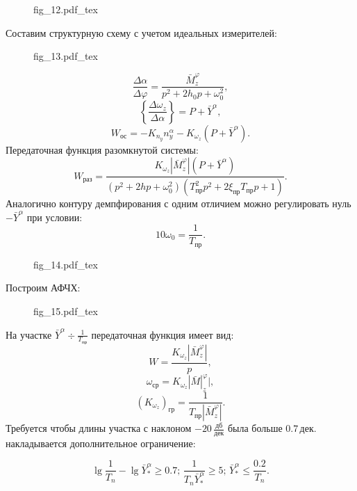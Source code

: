 \documentclass{article}
\begin{document}
\begin{figure}[H]
	\centering
	{fig_12.pdf_tex}
\end{figure}
Составим структурную схему с учетом идеальных измерителей:
\begin{figure}[H]
	\centering
	{fig_13.pdf_tex}
\end{figure}
\[
	\frac{\Delta \alpha}{\Delta \varphi} = \frac{\bar{M}_z^\varphi}{p^2 + 2 h_0
		p + \omega_0^2},
\]
\[
	\left\{ \frac{\Delta \omega_z}{\Delta \alpha}\right\} = P + \bar{Y}^\alpha,
\]
\[
	W_\text{ос} = -K_{n_y} n_y^\alpha - K_{\omega_z} (P + \bar{Y}^\alpha).
\]
Передаточная функция разомкнутой системы:
\[
	W_\text{раз} = \frac{K_{\omega_z} |\bar{M}_z^{\varphi}|(P +
	\bar{Y}^\alpha)}{(p^2 + 2h p + \omega_0^2)(T_\text{пр}^2 p^2 + 2
	\xi_\text{пр} T_\text{пр} p + 1)}.
\]
Аналогично контуру демпфирования с одним отличием можно регулировать нуль
$-\bar{Y}^\alpha$ при условии:
\[
    10 \omega_0 = \frac{1}{T_\text{пр}}.
\]
\begin{figure}[H]
	\centering
	{fig_14.pdf_tex}
\end{figure}
Построим АФЧХ:
\begin{figure}[H]
	\centering
	{fig_15.pdf_tex}
\end{figure}
На участке $\bar{Y}^\alpha \div \frac{1}{T_\text{пр}}$ передаточная функция
имеет вид:
\[
W = \frac{K_{\omega_z}|\bar{M}_z^\varphi|}{p},
\]
\[
	\omega_\text{ср} = K_{\omega_z} |\bar{M}|_z^\varphi|,
\]
\[
	(K_{\omega_z})_\text{гр} = \frac{1}{T_\text{пр} |\bar{M}_z^\varphi|}.
\]
Требуется чтобы длины участка с наклоном $-20 \, \frac{\text{дб}}{\text{дек}}$
была больше $0.7 \, \text{дек}.$ накладывается дополнительное ограничение:

\[
	\lg \frac{1}{T_n} - \lg \bar{Y}^{\alpha}_* \geq 0.7;\, \frac{1}{T_n
		\bar{Y}^{\alpha}_*} \geq 5; \, \bar{Y}^{\alpha}_* \leq \frac{0.2}{T_n}.
\]
\end{document}
